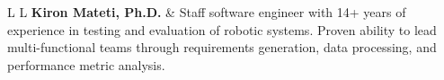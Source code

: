 \begin{tabular}{L{\lcolw} L{\rcolw}}
\textbf{\LARGE {Kiron Mateti, Ph.D.}} 
& {\large Staff software engineer with 14+ years of experience in testing and evaluation of robotic systems. 
Proven ability to lead multi-functional teams through requirements generation, data processing, 
and performance metric analysis.
}
\\ 
\\
\hline \hline \\ 
\end{tabular}